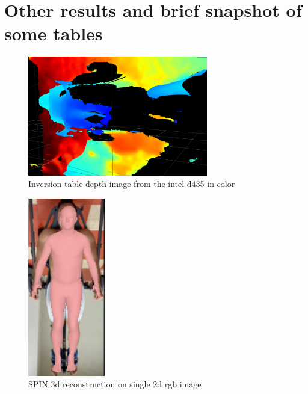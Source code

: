 
\chapter{Other results and brief snapshot of some tables}

\begin{figure}[h]
        \caption{Inversion table depth image from the intel d435 in color}
        \centering
        \includegraphics[width=0.7\textwidth]{images/inversion_depth.png}
\end{figure}
 

\begin{figure}[h]
        \caption{SPIN 3d reconstruction on single 2d rgb image}
        \centering
        \includegraphics[width=0.3\textwidth]{images/spin.png}
\end{figure}

